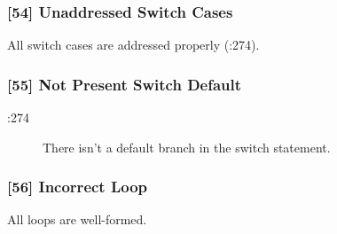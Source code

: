 \subsubsection{[54] Unaddressed Switch Cases}
All switch cases are addressed properly (:274).
\subsubsection{[55] Not Present Switch Default}
\begin{description}
	\item[:274] There isn't a default branch in the switch statement.
\end{description}
\subsubsection{[56] Incorrect Loop}
All loops are well-formed.